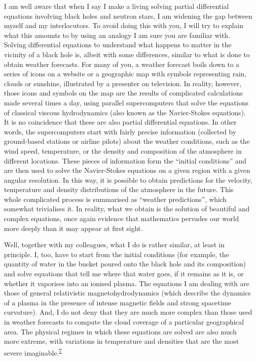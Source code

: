 I am well aware that when I say I make a living solving partial
differential equations involving black holes and neutron stars, I am
widening the gap between myself and my interlocutors. To avoid doing this with you, I
will try to explain what this amounts to by using an analogy I am sure you are familiar
with. Solving differential equations to understand what happens to matter in the
vicinity of a black hole is, albeit with some differences, similar to what is done to
obtain weather forecasts. For many of you, a weather forecast boils
down to a series of icons on a website or a geographic map with symbols representing
rain, clouds or sunshine, illustrated by a presenter on television. In reality, however,
those icons and symbols on the map are the results of complicated calculations made
several times a day, using parallel supercomputers that solve the
equations of classical viscous hydrodynamics (also known as the
Navier-Stokes equations). It is no coincidence that these are also
partial differential equations. In other words, the supercomputers
start with fairly precise information (collected by ground-based stations or airline
pilots) about the weather conditions, such as the wind speed, temperature, or the
density and composition of the atmosphere in different locations. These pieces of
information form the ``initial conditions'' and are then used to solve the
Navier-Stokes equations on a given region with a given angular
resolution. In this way, it is possible to obtain predictions for the
velocity, temperature and density distributions of the atmosphere in the future. This
whole complicated process is summarised as ``weather predictions'', which somewhat
trivialises it. In reality, what we obtain is the solution of beautiful and complex
equations, once again evidence that mathematics pervades our world more deeply than it
may appear at first sight.

Well, together with my colleagues, what I do is rather similar, at least in principle.
I, too, have to start from the initial conditions (for example, the quantity of water in
the bucket poured onto the black hole and its composition) and solve equations that tell
me where that water goes, if it remains as it is, or whether it vaporises into an
ionised plasma. The equations I am dealing with are those of general relativistic
magnetohydrodynamics (which describe the dynamics of a
plasma in the presence of intense magnetic fields and strong
spacetime curvature). And, I do not deny that they are much more complex than those used
in weather forecasts to compute the cloud coverage of a particular geographical area.
The physical regimes in which these equations are solved are also much more extreme,
with variations in temperature and densities that are the most severe
imaginable.\textsuperscript{\hyperlink{note:07-07}{7}}

